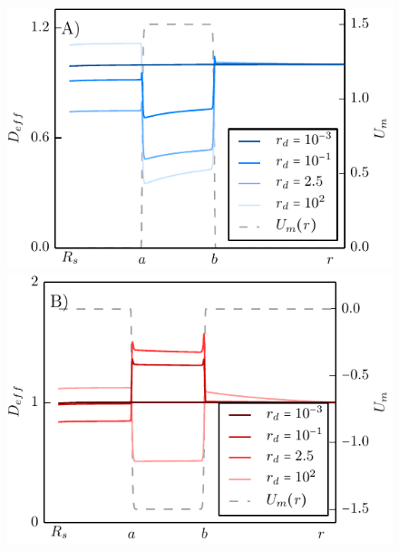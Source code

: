\begin{minipage}[t]{.63 \textwidth}
     \begin{figure}[H]
        \hspace{-1cm } \includegraphics[width = 1 \textwidth]{plots/repulsive_mapping_d.pdf} \\
        \hspace{-1cm } \includegraphics[width = 1 \textwidth]{plots/attractive_mapping_d.pdf} \\
    \end{figure}
\end{minipage}

